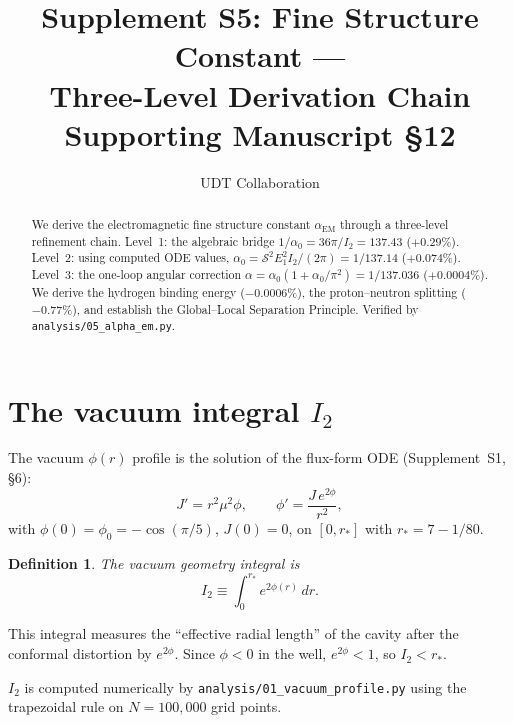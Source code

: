 \documentclass[11pt,letterpaper]{article}
\title{Supplement S5: Fine Structure Constant --- \\
Three-Level Derivation Chain \\
\large Supporting Manuscript \S12}
\author{UDT Collaboration}
\date{}
\newtheorem{definition}[theorem]{Definition}
\numberwithin{equation}{section}
\begin{document}
\maketitle

\begin{abstract}
We derive the electromagnetic fine structure constant $\alpha_\mathrm{EM}$
through a three-level refinement chain.  Level~1: the algebraic bridge
$1/\alpha_0 = 36\pi/I_2 = 137.43$ ($+0.29\%$).  Level~2: using computed ODE
values, $\alpha_0 = \mathcal{S}^2 E_1^2 I_2/(2\pi) = 1/137.14$ ($+0.074\%$).
Level~3: the one-loop angular correction
$\alpha = \alpha_0(1 + \alpha_0/\pi^2) = 1/137.036$ ($+0.0004\%$).  We derive
the hydrogen binding energy ($-0.0006\%$), the proton--neutron splitting
($-0.77\%$), and establish the Global--Local Separation Principle.  Verified by
\texttt{analysis/05\_alpha\_em.py}.
\end{abstract}

\tableofcontents

\section{The vacuum integral $I_2$}
\label{sec:I2}

The vacuum $\phi(r)$ profile is the solution of the flux-form ODE
(Supplement~S1, \S6):
\begin{equation}
  J' = r^2\mu^2\phi, \qquad \phi' = \frac{J\,e^{2\phi}}{r^2},
\end{equation}
with $\phi(0) = \phi_0 = -\cos(\pi/5)$, $J(0) = 0$, on $[0, r_*]$ with
$r_* = 7 - 1/80$.

\begin{definition}
The vacuum geometry integral is
\begin{equation}
\label{eq:I2_def}
  I_2 \equiv \int_0^{r_*} e^{2\phi(r)}\,dr.
\end{equation}
\end{definition}

This integral measures the ``effective radial length'' of the cavity after
the conformal distortion by $e^{2\phi}$. Since $\phi < 0$ in the well,
$e^{2\phi} < 1$, so $I_2 < r_*$.

$I_2$ is computed numerically by \texttt{analysis/01\_vacuum\_profile.py}
using the trapezoidal rule on $N = 100{,}000$ grid points.

\end{document}
